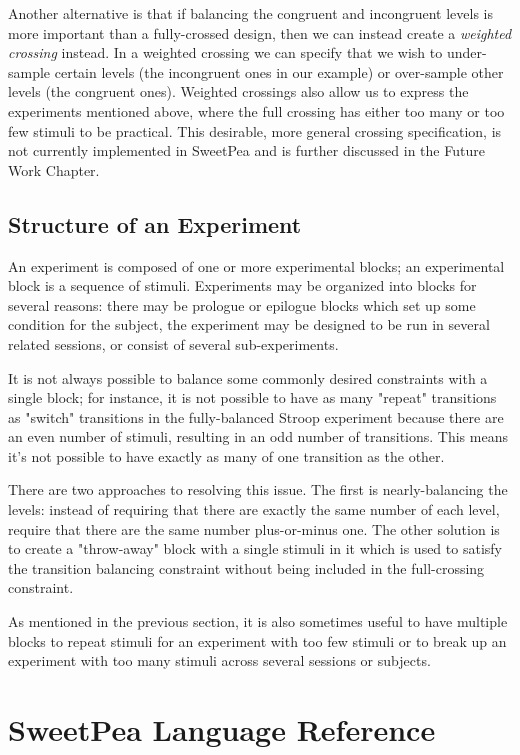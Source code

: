 Another alternative is that if balancing the congruent and incongruent levels is more important than a fully-crossed design, then we can instead create a \emph{weighted crossing} instead. In a weighted crossing we can specify that we wish to under-sample certain levels (the incongruent ones in our example) or over-sample other levels (the congruent ones). Weighted crossings also allow us to express the experiments mentioned above, where the full crossing has either too many or too few stimuli to be practical. This desirable, more general crossing specification, is not currently implemented in SweetPea and is further discussed in the Future Work Chapter.

\subsection{Structure of an Experiment}

An experiment is composed of one or more experimental blocks; an experimental block is a sequence of stimuli. Experiments may be organized into blocks for several reasons: there may be prologue or epilogue blocks which set up some condition for the subject, the experiment may be designed to be run in several related sessions, or consist of several sub-experiments.

It is not always possible to balance some commonly desired constraints with a single block; for instance, it is not possible to have as many "repeat" transitions as "switch" transitions in the fully-balanced Stroop experiment because there are an even number of stimuli, resulting in an odd number of transitions. This means it's not possible to have exactly as many of one transition as the other.

There are two approaches to resolving this issue. The first is nearly-balancing the levels: instead of requiring that there are exactly the same number of each level, require that there are the same number plus-or-minus one. The other solution is to create a "throw-away" block with a single stimuli in it which is used to satisfy the transition balancing constraint without being included in the full-crossing constraint.

As mentioned in the previous section, it is also sometimes useful to have multiple blocks to repeat stimuli for an experiment with too few stimuli or to break up an experiment with too many stimuli across several sessions or subjects.

\section{SweetPea Language Reference}

